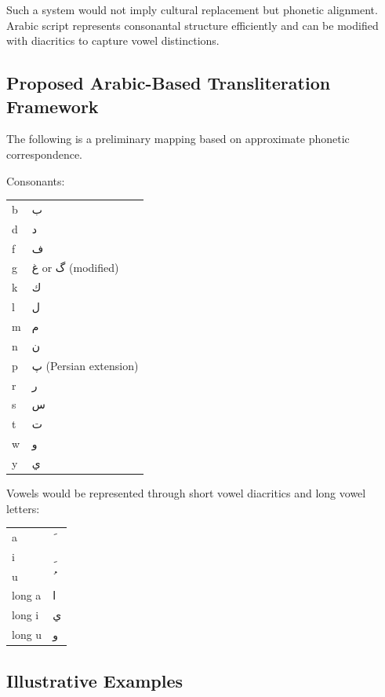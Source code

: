 \documentclass[12pt]{article}
\begin{document}
Such a system would not imply cultural replacement but phonetic alignment. Arabic script represents consonantal structure efficiently and can be modified with diacritics to capture vowel distinctions.

\subsection{Proposed Arabic-Based Transliteration Framework}

The following is a preliminary mapping based on approximate phonetic correspondence.

Consonants:

\begin{center}
\begin{tabular}{ll}
b & ب \\
d & د \\
f & ف \\
g & غ or گ (modified) \\
k & ك \\
l & ل \\
m & م \\
n & ن \\
p & پ (Persian extension) \\
r & ر \\
s & س \\
t & ت \\
w & و \\
y & ي \\
\end{tabular}
\end{center}

Vowels would be represented through short vowel diacritics and long vowel letters:

\begin{center}
\begin{tabular}{ll}
a & َ \\
i & ِ \\
u & ُ \\
long a & ا \\
long i & ي \\
long u & و \\
\end{tabular}
\end{center}

\subsection{Illustrative Examples}
\end{document}
